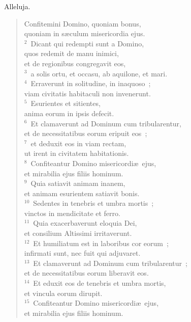 \lettrine[lines=3,image=true,loversize=0.05,lraise=-0.03]{A}{}lleluja. \begin{flushleft}\begin{verse}\vspace{6pt}Confitemini Domino, quoniam bonus,\\ quoniam in s\ae culum misericordia ejus.\\
${}^{2}$~Dicant qui redempti sunt a Domino,\\ quos redemit de manu inimici,\\ et de regionibus congregavit eos,\\
${}^{3}$~a solis ortu, et occasu, ab aquilone, et mari.\\
${}^{4}$~Erraverunt in solitudine, in inaquoso~;\\ viam civitatis habitaculi non invenerunt.\\
${}^{5}$~Esurientes et sitientes,\\ anima eorum in ipsis defecit.\\
${}^{6}$~Et clamaverunt ad Dominum cum tribularentur,\\ et de necessitatibus eorum eripuit eos~;\\
${}^{7}$~et deduxit eos in viam rectam,\\ ut irent in civitatem habitationis.\\
${}^{8}$~Confiteantur Domino misericordi\ae\ ejus,\\ et mirabilia ejus filiis hominum.\\
${}^{9}$~Quia satiavit animam inanem,\\ et animam esurientem satiavit bonis.\\
${}^{10}$~Sedentes in tenebris et umbra mortis~;\\ vinctos in mendicitate et ferro.\\
${}^{11}$~Quia exacerbaverunt eloquia Dei,\\ et consilium Altissimi irritaverunt.\\
${}^{12}$~Et humiliatum est in laboribus cor eorum~;\\ infirmati sunt, nec fuit qui adjuvaret.\\
${}^{13}$~Et clamaverunt ad Dominum cum tribularentur~;\\ et de necessitatibus eorum liberavit eos.\\
${}^{14}$~Et eduxit eos de tenebris et umbra mortis,\\ et vincula eorum dirupit.\\
${}^{15}$~Confiteantur Domino misericordi\ae\ ejus,\\ et mirabilia ejus filiis hominum.\\

\end{verse}
\end{flushleft}
